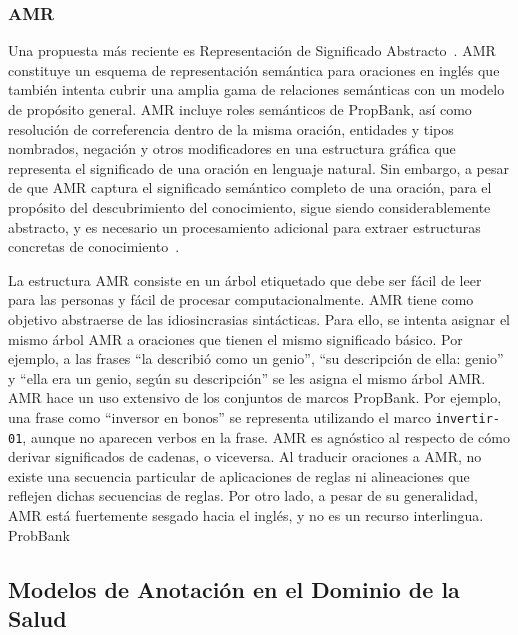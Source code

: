 \subsubsection*{AMR}

Una propuesta más reciente es Representación de Significado Abstracto~\cite[AMR]{amr}.
AMR constituye un esquema de representación semántica para oraciones en inglés que también intenta cubrir una amplia gama de relaciones semánticas con un modelo de propósito general.
AMR incluye roles semánticos de PropBank, así como resolución de correferencia dentro de la misma oración, entidades y tipos nombrados, negación y otros modificadores en una estructura gráfica que representa el significado de una oración en lenguaje natural.
Sin embargo, a pesar de que AMR captura el significado semántico completo de una oración, para el propósito del descubrimiento del conocimiento, sigue siendo considerablemente abstracto, y es necesario un procesamiento adicional para extraer estructuras concretas de conocimiento~\cite{rao2017biomedical}.

La estructura AMR consiste en un árbol etiquetado que debe ser fácil de leer para las personas y fácil de procesar computacionalmente.
AMR tiene como objetivo abstraerse de las idiosincrasias sintácticas.
Para ello, se intenta asignar el mismo árbol AMR a oraciones que tienen el mismo significado básico.
Por ejemplo, a las frases ``la describió como un genio'', ``su descripción de ella: genio'' y ``ella era un genio, según su descripción'' se les asigna el mismo árbol AMR.
AMR hace un uso extensivo de los conjuntos de marcos PropBank.
Por ejemplo, una frase como ``inversor en bonos'' se representa utilizando el marco \texttt{invertir-01}, aunque no aparecen verbos en la frase.
AMR es agnóstico al respecto de cómo derivar significados de cadenas, o viceversa.
Al traducir oraciones a AMR, no existe una secuencia particular de aplicaciones de reglas ni alineaciones que reflejen dichas secuencias de reglas.
Por otro lado, a pesar de su generalidad, AMR está fuertemente sesgado hacia el inglés, y no es un recurso interlingua.
ProbBank
\subsection{Modelos de Anotación en el Dominio de la Salud}\label{sec:health}

